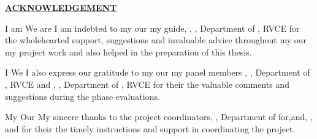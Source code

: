 \thispagestyle{empty}
\ifIDP \vspace{-1cm}\fi
\begin{center}
	\Large\textbf{\underline{ACKNOWLEDGEMENT}} \par
\end{center}

\ifPG I am \else \ifStuNameBUsed We are \else I am \fi\fi indebted to \ifPG my \else\ifStuNameBUsed our \else my \fi\fi guide, \textbf{\printGuideNameA}, \printGuideDesigA, Department of \printGuideDeptAInSF, RVCE for the wholehearted support, suggestions and invaluable advice throughout \ifPG my \else\ifStuNameBUsed our \else my \fi\fi project work and also helped in the preparation of this thesis.\\ \par
\vspace{-18pt}
\ifPG I \else \ifStuNameBUsed We \else I \fi\fi also express our gratitude to \ifPG my \else\ifStuNameBUsed our \else my \fi\fi panel member\ifIDP\space\else\ifPanelMemBUsed s \space\else\space\fi\fi\textbf{\printPanelMemberA}, \printPanelMemberDesigA, Department of \printPanelMemberDeptAInSF, RVCE \ifIDP \else \ifPanelMemBUsed and \textbf{\printPanelMemberB}, \printPanelMemberDesigB , Department of \printPanelMemberDeptBInSF, RVCE \fi\fi for \ifPanelMemBUsed their \else the \fi valuable comments and suggestions during the phase evaluations. \\ \par
\vspace{-18pt}
\ifPG My \else \ifStuNameBUsed Our \else My \fi\fi sincere thanks to the project coordinator\ifIDP\else\ifProjectMemBUsed s\fi\fi\space \textbf{\printProjectMemberA}, \printProjectMemberDesigA, Department of \printProjectMemberDeptAInSF \ifIDP \space for\space \else\ifProjectMemBUsed \ifProjectMemCUsed,\space \else\space and\space \fi\textbf{\printProjectMemberB}, \printProjectMemberDesigB,  \ifProjectMemCUsed\space and \textbf{\printProjectMemberC} \fi\fi\space for \ifProjectMemBUsed their \else the \fi\fi timely instructions and support in coordinating the project.\\ \par
